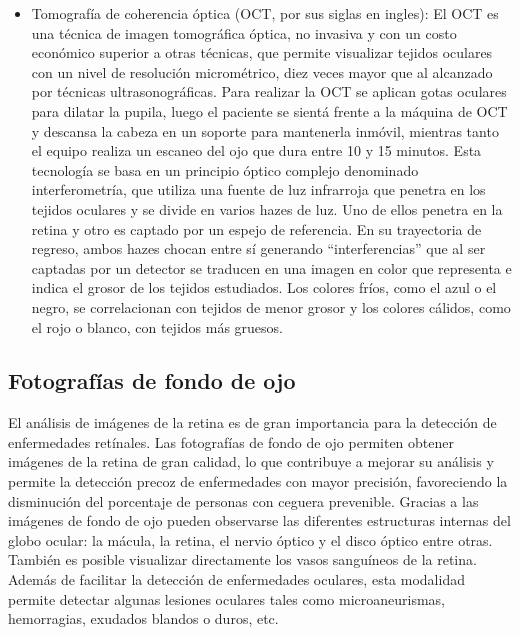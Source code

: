 \begin{itemize}
\item Tomograf\'ia de coherencia \'optica (OCT, por sus siglas en ingles): El OCT es una t\'ecnica de imagen tomogr\'afica \'optica, no invasiva y con un costo econ\'omico superior a otras t\'ecnicas, que permite visualizar tejidos oculares con un nivel de resoluci\'on microm\'etrico, diez veces mayor que al alcanzado por t\'ecnicas ultrasonogr\'aficas. Para realizar la OCT se aplican  gotas oculares para dilatar la pupila, luego el paciente se sient\'a frente a la m\'aquina de OCT y descansa  la cabeza en un soporte para mantenerla inm\'ovil, mientras tanto el equipo realiza un escaneo del ojo que dura entre 10 y 15 minutos. Esta tecnolog\'ia se basa en un principio \'optico complejo denominado interferometr\'ia, que utiliza una fuente de luz infrarroja que penetra en los tejidos oculares y se divide en varios hazes de luz. Uno de ellos penetra en la retina y otro es captado por un espejo de referencia. En su trayectoria de regreso, ambos hazes chocan entre s\'i generando “interferencias” que al ser captadas por un detector se traducen en una imagen en color que representa e indica el grosor de los tejidos estudiados. Los colores fr\'ios, como el azul o el negro, se correlacionan con tejidos de menor grosor y los colores c\'alidos, como el rojo o blanco, con tejidos m\'as gruesos. 

\end{itemize}



\subsection{Fotograf\'ias de fondo de ojo}

El an\'alisis de im\'agenes de la retina es de gran importancia para la detecci\'on de enfermedades ret\'inales. Las fotograf\'ias de fondo de ojo permiten obtener im\'agenes de la retina de gran calidad, lo que contribuye a mejorar su an\'alisis y permite la detecci\'on precoz de enfermedades con mayor precisi\'on, favoreciendo la disminuci\'on del porcentaje de personas con ceguera prevenible. \cite{wang2015fundus} 
Gracias a las im\'agenes de fondo de ojo pueden observarse las diferentes estructuras internas del globo ocular: la m\'acula, la retina, el nervio \'optico y el disco \'optico entre otras. Tambi\'en es posible visualizar directamente los vasos sangu\'ineos de la retina. Adem\'as de facilitar la detecci\'on de enfermedades oculares, esta modalidad permite detectar algunas lesiones oculares tales como microaneurismas, hemorragias, exudados blandos o duros, etc. \cite{haddock2013simple}

